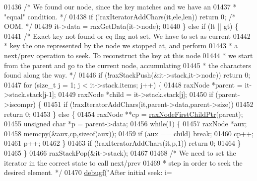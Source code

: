 \begin{DoxyCode}
{{{{{{{{{{{{{{{{{{{{01436         \textcolor{comment}{/* We found our node, since the key matches and we have an}
01437 \textcolor{comment}{         * "equal" condition. */}
01438         \textcolor{keywordflow}{if} (!raxIteratorAddChars(it,ele,len)) \textcolor{keywordflow}{return} 0; \textcolor{comment}{/* OOM. */}
01439         it->data = raxGetData(it->node);
01440     \} \textcolor{keywordflow}{else} \textcolor{keywordflow}{if} (lt || gt) \{
01441         \textcolor{comment}{/* Exact key not found or eq flag not set. We have to set as current}
01442 \textcolor{comment}{         * key the one represented by the node we stopped at, and perform}
01443 \textcolor{comment}{         * a next/prev operation to seek. To reconstruct the key at this node}
01444 \textcolor{comment}{         * we start from the parent and go to the current node, accumulating}
01445 \textcolor{comment}{         * the characters found along the way. */}
01446         \textcolor{keywordflow}{if} (!raxStackPush(&it->stack,it->node)) \textcolor{keywordflow}{return} 0;
01447         \textcolor{keywordflow}{for} (size\_t j = 1; j < it->stack.items; j++) \{
01448             raxNode *parent = it->stack.stack[j-1];
01449             raxNode *child = it->stack.stack[j];
01450             \textcolor{keywordflow}{if} (parent->iscompr) \{
01451                 \textcolor{keywordflow}{if} (!raxIteratorAddChars(it,parent->data,parent->size))
01452                     \textcolor{keywordflow}{return} 0;
01453             \} \textcolor{keywordflow}{else} \{
01454                 raxNode **cp = \hyperlink{rax_8c_aa94163a0d02b30219ef18e5a3ea06ca6}{raxNodeFirstChildPtr}(parent);
01455                 \textcolor{keywordtype}{unsigned} \textcolor{keywordtype}{char} *p = parent->data;
01456                 \textcolor{keywordflow}{while}(1) \{
01457                     raxNode *aux;
01458                     memcpy(&aux,cp,\textcolor{keyword}{sizeof}(aux));
01459                     \textcolor{keywordflow}{if} (aux == child) \textcolor{keywordflow}{break};
01460                     cp++;
01461                     p++;
01462                 \}
01463                 \textcolor{keywordflow}{if} (!raxIteratorAddChars(it,p,1)) \textcolor{keywordflow}{return} 0;
01464             \}
01465         \}
01466         raxStackPop(&it->stack);
01467 
01468         \textcolor{comment}{/* We need to set the iterator in the correct state to call next/prev}
01469 \textcolor{comment}{         * step in order to seek the desired element. */}
01470         \hyperlink{rax_8c_a10b215c81aa397dbc44adfb3e436befb}{debugf}(\textcolor{stringliteral}{"After initial seek: i=%
}}}}}}}}}}}}}}}}}}}}}
\end{DoxyCode}
